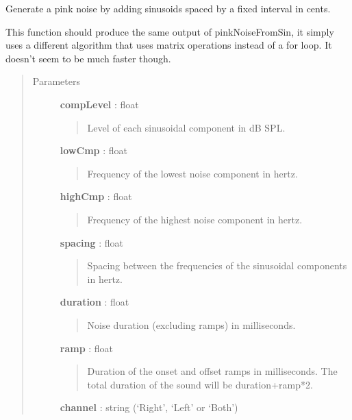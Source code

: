\documentclass[a4paper,12pt,english]{sphinxmanual}
\begin{document}
\begin{fulllineitems}
\label{sndlib:sndlib.pinkNoiseFromSin2}
Generate a pink noise by adding sinusoids spaced by a fixed
interval in cents.

This function should produce the same output of pinkNoiseFromSin,
it simply uses a different algorithm that uses matrix operations
instead of a for loop. It doesn't seem to be much faster though.
\begin{quote}\begin{description}
\item[{Parameters }] \leavevmode
\textbf{compLevel} : float
\begin{quote}

Level of each sinusoidal component in dB SPL.
\end{quote}

\textbf{lowCmp} : float
\begin{quote}

Frequency of the lowest noise component in hertz.
\end{quote}

\textbf{highCmp} : float
\begin{quote}

Frequency of the highest noise component in hertz.
\end{quote}

\textbf{spacing} : float
\begin{quote}

Spacing between the frequencies of the sinusoidal components
in hertz.
\end{quote}

\textbf{duration} : float
\begin{quote}

Noise duration (excluding ramps) in milliseconds.
\end{quote}

\textbf{ramp} : float
\begin{quote}

Duration of the onset and offset ramps in milliseconds.
The total duration of the sound will be duration+ramp*2.
\end{quote}

\textbf{channel} : string (`Right', `Left' or `Both')
\begin{quote}


\end{quote}
\end{description}
\end{quote}
\end{fulllineitems}
\end{document}
